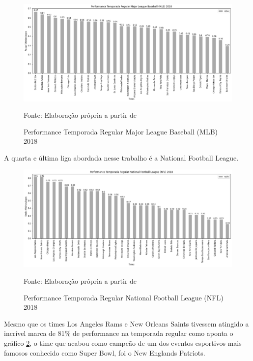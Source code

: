 \documentclass[12pt,oneside,a4paper,chapter=TITLE,english,brazil,sumario=abnt-6027-2012]{abntex2}
\begin{document}
	\begin{figure}[htbp]
		\centering
		\caption{Performance Temporada Regular Major League Baseball (MLB) 2018}
		\includegraphics[scale=0.4]{../../output/figures/mlb.png}
		\label{mlb}
		\\ \vspace{0.25cm}
		\raggedright
		\footnotesize{Fonte: Elaboração própria a partir de }
	\end{figure}
	
	
	A quarta e última liga abordada nesse trabalho é a National Football League. 
	
	\begin{figure}[H]
		\centering
		\caption{Performance Temporada Regular National Football League (NFL) 2018}
		\includegraphics[scale=0.4]{../../output/figures/nfl.png}
		\label{nfl}
		\\ \vspace{0.25cm}
		\raggedright
		\footnotesize{Fonte: Elaboração própria a partir de }
	\end{figure}
	
	Mesmo que os times Los Angeles Rams e New Orleans Saints tivessem atingido a incrível marca de 81\% de performance na temporada regular como aponta o gráfico \ref{nfl}, o time que acabou como campeão de um dos eventos esportivos mais famosos conhecido como Super Bowl, foi o New Englands Patriots.
\end{document}
